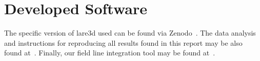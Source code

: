 \section{Developed Software}

The specific version of lare3d used can be found via Zenodo~\cite{tonyarber_2019_3560251}. The data analysis and instructions for reproducing all results found in this report may be also found at~\cite{jamie_j_quinn_2019_3560245}. Finally, our field line integration tool may be found at~\cite{jamie_j_quinn_2019_3560249}.

